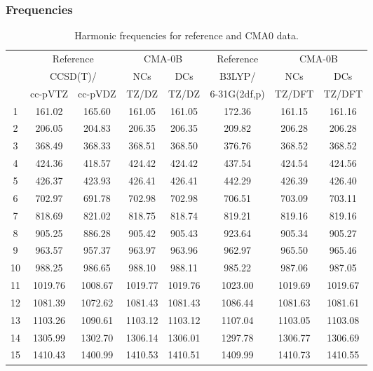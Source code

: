 \documentclass[10pt,oneside]{article}
\begin{document}
\clearpage

\subsubsection*{Frequencies}
\begin{table}[h!]
\centering
\caption{Harmonic frequencies for reference and CMA0 data.}
\begin{tabular}{cccccccc}
\toprule
{} & \multicolumn{2}{c}{Reference} & \multicolumn{2}{c}{CMA-0B} &    Reference & \multicolumn{2}{c}{CMA-0B} \\
{} & \multicolumn{2}{c}{CCSD(T)/} &     NCs &     DCs &       B3LYP/ &     NCs &     DCs \\
{} &   cc-pVTZ & cc-pVDZ &   TZ/DZ &   TZ/DZ & 6-31G(2df,p) &  TZ/DFT &  TZ/DFT \\
\midrule
1  &    161.02 &  165.60 &  161.05 &  161.05 &       172.36 &  161.15 &  161.16 \\
2  &    206.05 &  204.83 &  206.35 &  206.35 &       209.82 &  206.28 &  206.28 \\
3  &    368.49 &  368.33 &  368.51 &  368.50 &       376.76 &  368.52 &  368.52 \\
4  &    424.36 &  418.57 &  424.42 &  424.42 &       437.54 &  424.54 &  424.56 \\
5  &    426.37 &  423.93 &  426.41 &  426.41 &       442.29 &  426.39 &  426.40 \\
6  &    702.97 &  691.78 &  702.98 &  702.98 &       706.51 &  703.09 &  703.11 \\
7  &    818.69 &  821.02 &  818.75 &  818.74 &       819.21 &  819.16 &  819.16 \\
8  &    905.25 &  886.28 &  905.42 &  905.43 &       923.64 &  905.34 &  905.27 \\
9  &    963.57 &  957.37 &  963.97 &  963.96 &       962.97 &  965.50 &  965.46 \\
10 &    988.25 &  986.65 &  988.10 &  988.11 &       985.22 &  987.06 &  987.05 \\
11 &   1019.76 & 1008.67 & 1019.77 & 1019.76 &      1023.00 & 1019.69 & 1019.67 \\
12 &   1081.39 & 1072.62 & 1081.43 & 1081.43 &      1086.44 & 1081.63 & 1081.61 \\
13 &   1103.26 & 1090.61 & 1103.12 & 1103.12 &      1107.04 & 1103.05 & 1103.08 \\
14 &   1305.99 & 1302.70 & 1306.14 & 1306.01 &      1297.78 & 1306.77 & 1306.69 \\
15 &   1410.43 & 1400.99 & 1410.53 & 1410.51 &      1409.99 & 1410.73 & 1410.55 \\

\end{tabular}
\end{table}
\end{document}
